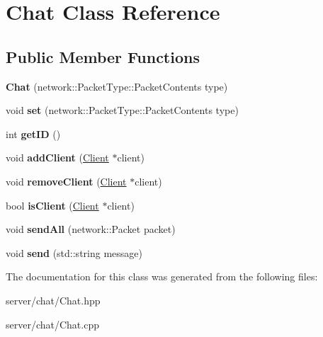 \hypertarget{class_chat}{\section{Chat Class Reference}
\label{class_chat}
}
\subsection*{Public Member Functions}
\begin{DoxyCompactItemize}
\item 
\hypertarget{class_chat_aeaf64c44db4ddc1d04d773fa6e7575a8}{{\bfseries Chat} (network\-::\-Packet\-Type\-::\-Packet\-Contents type)}\label{class_chat_aeaf64c44db4ddc1d04d773fa6e7575a8}

\item 
\hypertarget{class_chat_a3bf7882f0420463389239cea5531ebe8}{void {\bfseries set} (network\-::\-Packet\-Type\-::\-Packet\-Contents type)}\label{class_chat_a3bf7882f0420463389239cea5531ebe8}

\item 
\hypertarget{class_chat_ab4de0f927392b4a83de58030e7f64078}{int {\bfseries get\-I\-D} ()}\label{class_chat_ab4de0f927392b4a83de58030e7f64078}

\item 
\hypertarget{class_chat_a9bb9a6cd25b90a5e6c3407163e89d9f1}{void {\bfseries add\-Client} (\hyperlink{class_client}{Client} $\ast$client)}\label{class_chat_a9bb9a6cd25b90a5e6c3407163e89d9f1}

\item 
\hypertarget{class_chat_aa33e9f30ab631131692551049e74dd91}{void {\bfseries remove\-Client} (\hyperlink{class_client}{Client} $\ast$client)}\label{class_chat_aa33e9f30ab631131692551049e74dd91}

\item 
\hypertarget{class_chat_a9e110cbe0d7ff02c0a27c480d67d4987}{bool {\bfseries is\-Client} (\hyperlink{class_client}{Client} $\ast$client)}\label{class_chat_a9e110cbe0d7ff02c0a27c480d67d4987}

\item 
\hypertarget{class_chat_a89685c6bf1ff19f1d2ef762840929ffa}{void {\bfseries send\-All} (network\-::\-Packet packet)}\label{class_chat_a89685c6bf1ff19f1d2ef762840929ffa}

\item 
\hypertarget{class_chat_ad50f11e2a552fc3f935dfef30ed0191b}{void {\bfseries send} (std\-::string message)}\label{class_chat_ad50f11e2a552fc3f935dfef30ed0191b}

\end{DoxyCompactItemize}


The documentation for this class was generated from the following files\-:\begin{DoxyCompactItemize}
\item 
server/chat/Chat.\-hpp\item 
server/chat/Chat.\-cpp\end{DoxyCompactItemize}
